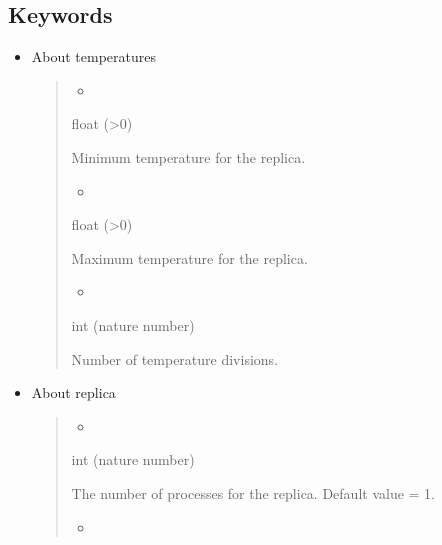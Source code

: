 \documentclass[letterpaper,10pt,english]{sphinxmanual}
\begin{document}
\subsection{Keywords}
\label{\detokenize{file_specification/parameter_replica:keywords}}\begin{itemize}
\item {} 
About temperatures
\begin{quote}
\begin{itemize}
\item {} 

\end{itemize}

 float (\textgreater{}0)

Minimum temperature for the replica.
\begin{itemize}
\item {} 

\end{itemize}

 float (\textgreater{}0)

Maximum temperature for the replica.
\begin{itemize}
\item {} 

\end{itemize}

 int (nature number)

 Number of temperature divisions.
\end{quote}

\item {} 
About replica
\begin{quote}
\begin{itemize}
\item {} 

\end{itemize}

 int (nature number)

 The number of processes for the replica. Default value = 1.
\begin{itemize}
\item {} 

\end{itemize}


\end{quote}
\end{itemize}
\end{document}

